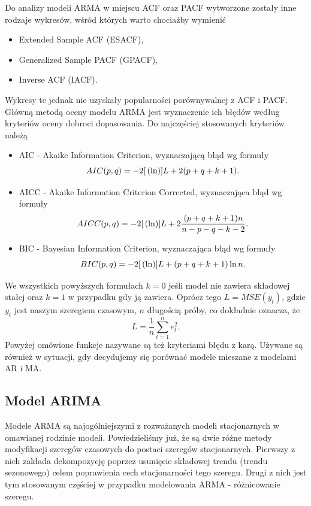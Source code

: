 \documentclass[10pt,a4paper]{book}
\begin{document}
Do analizy modeli ARMA w miejscu ACF oraz PACF wytworzone zostały inne rodzaje wykresów, wśród których warto chociażby wymienić

\begin{itemize}
\item Extended Sample ACF (ESACF), 
\item Generalized Sample PACF (GPACF),
\item Inverse ACF (IACF).
\end{itemize}

Wykresy te jednak nie uzyskały popularności porównywalnej z ACF i PACF. Główną metodą oceny modelu ARMA jest wyznaczenie ich błędów według kryteriów oceny dobroci dopasowania. Do najczęściej stosowanych kryteriów należą 

\begin{itemize}
\item AIC - Akaike Information Criterion, wyznaczającą błąd wg formuły 
$$
AIC(p,q) = -2 {{[}\left( {\ln} \right)}]{L} + 2 {\left( {p+q+k+1} \right)}.
$$
\item AICC - Akaike Information Criterion Corrected, wyznaczająca błąd wg formuły 
$$
AICC(p,q) = -2 {{[}\left( {\ln} \right)}]{L} + 2 \frac{{\left( {p+q+k+1} \right)}  n}{n-p-q-k-2}.
$$
\item BIC - Bayesian Information Criterion, wyznaczająca błąd wg formuły
$$
BIC(p,q) = -2 {{[}\left( {\ln} \right)}]{L} + {\left( {p+q+k+1} \right)} \ln n.
$$
\end{itemize}
We wszystkich powyższych formułach $k=0$ jeśli model nie zawiera składowej stałej oraz $k=1$ w przypadku gdy ją zawiera. Oprócz tego $L=MSE(y_t)$, gdzie $y_t$ jest naszym szeregiem czasowym, $n$ długością próby, co dokładnie oznacza, że 
$$
L = \frac{1}{n} \sum_{t=1}^{n} e_t^2.
$$
Powyżej omówione funkcje nazywane są też kryteriami błędu z karą. Używane są również w sytuacji, gdy decydujemy się porównać modele mieszane z modelami AR i MA.

\subsection{Model ARIMA}

Modele ARMA są najogólniejszymi z rozważanych modeli stacjonarnych w omawianej rodzinie modeli. Powiedzieliśmy już, że są dwie różne metody modyfikacji szeregów czasowych do postaci szeregów stacjonarnych. Pierwszy z nich zakłada dekompozycję poprzez usunięcie składowej trendu (trendu sezonowego) celem poprawienia cech stacjonarności tego szeregu. Drugi z nich jest tym stosowanym częściej w przypadku modelowania ARMA - różnicowanie szeregu.
\end{document}
